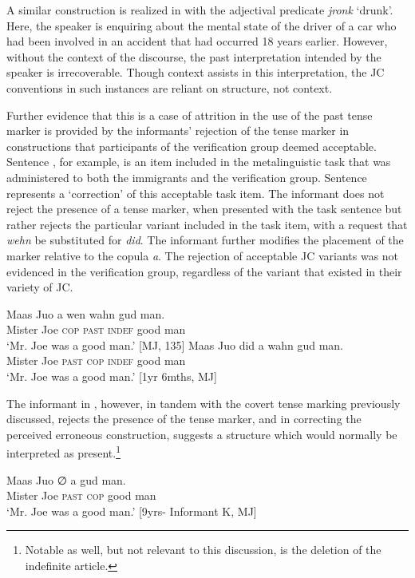 \documentclass[output=paper,colorlinks,citecolor=brown]{langscibook}
\begin{document}
A similar construction is realized in  with the adjectival predicate \textit{jronk} ‘drunk’. Here, the speaker is enquiring about the mental state of the driver of a car who had been involved in an accident that had occurred 18 years earlier. However, without the context of the discourse, the past interpretation intended by the speaker is irrecoverable. Though context assists in this interpretation, the JC conventions in such instances are reliant on structure, not context.

Further evidence that this is a case of attrition in the use of the past tense marker is provided by the informants’ rejection of the tense marker in constructions that participants of the verification group deemed acceptable. Sentence , for example, is an item included in the metalinguistic task that was administered to both the immigrants and the verification group. Sentence  represents a ‘correction’ of this acceptable task item. The informant does not reject the presence of a tense marker, when presented with the task sentence but rather rejects the particular variant included in the task item, with a request that \textit{wehn} be substituted for \textit{did}. The informant further modifies the placement of the marker relative to the copula \textit{a}. The rejection of acceptable JC variants was not evidenced in the verification group, regardless of the variant that existed in their variety of JC.

\ea \label{bkm:messamK:18}
\gll  Maas   Juo a    wen    wahn  gud   man.\\
Mister Joe \textsc{cop} \textsc{past}  \textsc{indef}  good man\\
\glt `Mr. Joe was a good man.’  [MJ, 135]
\ex \label{bkm:messamK:19}
\gll  Maas   Juo did   a      wahn  gud   man.\\
Mister Joe \textsc{past} \textsc{cop}  \textsc{indef} good man\\
\glt `Mr. Joe was a good man.’      [1yr 6mths, MJ]
\z



The informant in , however, in tandem with the covert tense marking previously discussed, rejects the presence of the tense marker, and in correcting the perceived erroneous construction, suggests a structure which would normally be interpreted as present.\footnote{Notable as well, but not relevant to this discussion, is the deletion of the indefinite article.}

\ea \label{bkm:messamK:20}
\gll  Maas   Juo ∅  a      gud   man. \\
Mister Joe \textsc{past}   \textsc{cop}  good man\\
\glt `Mr. Joe was a good man.’             [9yrs- Informant K, MJ]
\z
\end{document}
